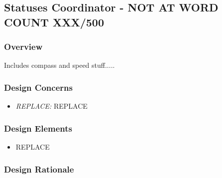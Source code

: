 \subsection{Statuses Coordinator - NOT AT WORD COUNT XXX/500}
\subsubsection{Overview}
Includes compass and speed stuff.....

\subsubsection{Design Concerns}
\begin{itemize}
\item \textit{REPLACE:} REPLACE

\end{itemize}

\subsubsection{Design Elements}
\begin{itemize}
\item REPLACE
\end{itemize}

\subsubsection{Design Rationale}
